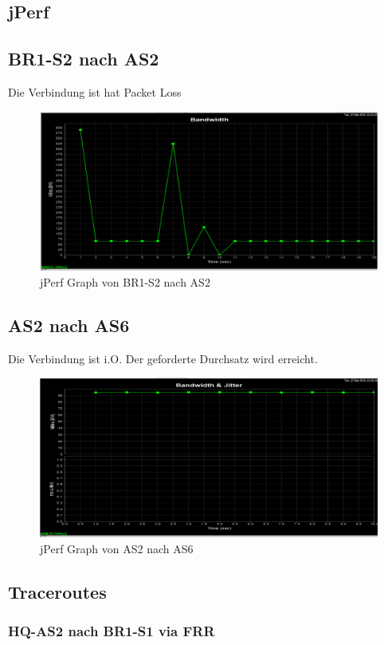 \subsection{jPerf}

\subsection{BR1-S2 nach AS2}
Die Verbindung ist hat Packet Loss
\begin{figure}[h]
	\centering
	\includegraphics[width=0.7\linewidth]{appendix/measurements/jperf/br1-s2-to-as2}
	\caption{jPerf Graph von BR1-S2 nach AS2}
	\label{fig:as2-to-as6}
\end{figure}

\subsection{AS2 nach AS6}
Die Verbindung ist i.O. Der geforderte Durchsatz wird erreicht.
\begin{figure}[h]
\centering
\includegraphics[width=0.7\linewidth]{appendix/measurements/jperf/as2-to-as6}
\caption{jPerf Graph von AS2 nach AS6}
\label{fig:as2-to-as6}
\end{figure}



\subsection{Traceroutes}
\subsubsection{HQ-AS2 nach BR1-S1 via FRR}


